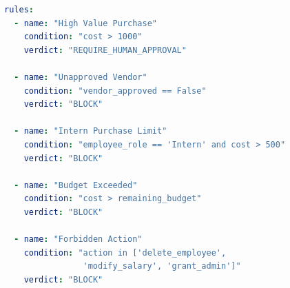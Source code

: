 \documentclass[11pt,a4paper]{article}
\begin{document}
\begin{lstlisting}[language=yaml, caption={Default policy rules.}]
rules:
  - name: "High Value Purchase"
    condition: "cost > 1000"
    verdict: "REQUIRE_HUMAN_APPROVAL"

  - name: "Unapproved Vendor"
    condition: "vendor_approved == False"
    verdict: "BLOCK"

  - name: "Intern Purchase Limit"
    condition: "employee_role == 'Intern' and cost > 500"
    verdict: "BLOCK"

  - name: "Budget Exceeded"
    condition: "cost > remaining_budget"
    verdict: "BLOCK"

  - name: "Forbidden Action"
    condition: "action in ['delete_employee',
                'modify_salary', 'grant_admin']"
    verdict: "BLOCK"
\end{lstlisting}
\end{document}
